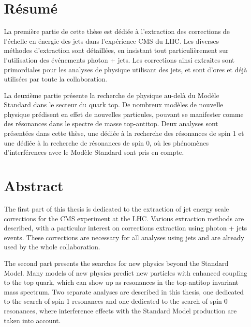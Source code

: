 \begingroup
\let\clearpage\relax
\let\cleardoublepage\relax
\let\cleardoublepage\relax

\chapter*{Résumé}

La première partie de cette thèse est dédiée à l'extraction des corrections de l'échelle en énergie des jets dans l'expérience CMS du LHC. Les diverses méthodes d'extraction sont détaillées, en insistant tout particulièrement sur l'utilisation des événements photon + jets. Les corrections ainsi extraites sont primordiales pour les analyses de physique utilisant des jets, et sont d'ores et déjà utilisées par toute la collaboration.

La deuxième partie présente la recherche de physique au-delà du Modèle Standard dans le secteur du quark top. De nombreux modèles de nouvelle physique prédisent en effet de nouvelles particules, pouvant se manifester comme des résonances dans le spectre de masse top-antitop. Deux analyses sont présentées dans cette thèse, une dédiée à la recherche des résonances de spin 1 et une dédiée à la recherche de résonances de spin 0, où les phénomènes d'interférences avec le Modèle Standard sont pris en compte.

\vfill

\chapter*{Abstract}

The first part of this thesis is dedicated to the extraction of jet energy scale corrections for the CMS experiment at the LHC. Various extraction methods are described, with a particular interest on corrections extraction using photon + jets events. These corrections are necessary for all analyses using jets and are already used by the whole collaboration.

The second part presents the searches for new physics beyond the Standard Model. Many models of new physics predict new particles with enhanced coupling to the top quark, which can show up as resonances in the top-antitop invariant mass spectrum. Two separate analyses are described in this thesis, one dedicated to the search of spin 1 resonances and one dedicated to the search of spin 0 resonances, where interference effects with the Standard Model production are taken into account.

\endgroup

\vfill